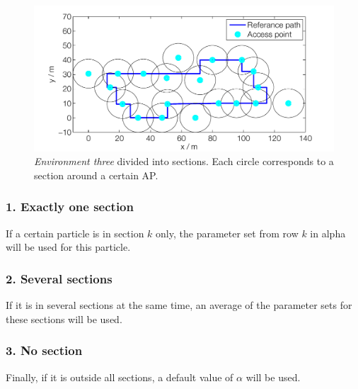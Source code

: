 \documentclass{LTHthesis}
\begin{document}
\begin{figure}[!hbt]

\includegraphics[width=1\textwidth ]{images/adapt_parameters/ap_sections}
\caption{\emph{Environment three} divided into sections. Each circle corresponds to a section around a certain AP.}\label{alpha_sections}
\end{figure}


\subsubsection{1. Exactly one section}
If a certain particle is in section $k$ only, 
the parameter set from row $k$ in alpha will be used for this particle. 

\subsubsection{2. Several sections}
If it is in several sections at the same time, an average of the parameter sets for these sections will be used.

\subsubsection{3. No section}
Finally, if it is outside all sections, a default value of $\alpha$ will be used.
\end{document}
